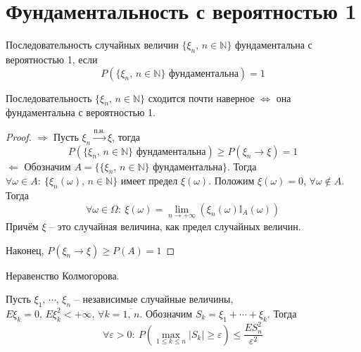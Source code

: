 \section{Фундаментальность с вероятностью 1}
\begin{definition}
	Последовательность случайных величин $\{\xi_n,\, n \in \mathbb{N}\}$ фундаментальна с вероятностью 1, если
	\[P(\{\xi_n,\, n \in \mathbb{N}\} \text{ фундаментальна}) = 1\]
\end{definition}

\begin{proposition}
	Последовательность $\{\xi_n,\, n \in \mathbb{N}\}$ сходится почти наверное $\Leftrightarrow$ она фундаментальна с вероятностью 1.
\end{proposition}

\begin{proof}
	$\Rightarrow$ Пусть $\xi_n \stackrel{\text{п.н.}}{\to} \xi$, тогда
	\[P(\{\xi_n,\, n \in \mathbb{N}\} \text{ фундаментальна}) \geq P(\xi_n \to \xi) = 1\]
	$\Leftarrow$ Обозначим $A = \{\{\xi_n,\, n \in \mathbb{N}\} \text{ фундаментальна}\}$. Тогда $\forall \omega \in A:\: \{\xi_n(\omega),\, n \in \mathbb{N}\}$ имеет предел $\xi(\omega)$. Положим $\xi(\omega) = 0,\, \forall \omega \not\in A$. Тогда
	\[\forall \omega \in \Omega:\: \xi(\omega) = \lim_{n \to +\infty}(\xi_n(\omega)\mathbb{I}_A(\omega))\]
	Причём $\xi$ -- это случайная величина, как предел случайных величин.

	Наконец, $P(\xi_n \to \xi) \geq P(A) = 1$
\end{proof}

\begin{theorem}
	Неравенство Колмогорова.

	Пусть $\xi_1,\,\cdots,\,\xi_n$ -- независимые случайные величины, $E\xi_k = 0,\, E\xi_k^2 < +\infty,\, \forall k = \overline{1,\,n}$. Обозначим $S_k = \xi_1 + \cdots + \xi_k$. Тогда
	\[\forall \varepsilon > 0:\: P\left(\max_{1 \leq k \leq n} |S_k| \geq \varepsilon\right) \leq \frac{ES_n^2}{\varepsilon^2}\]
\end{theorem}


